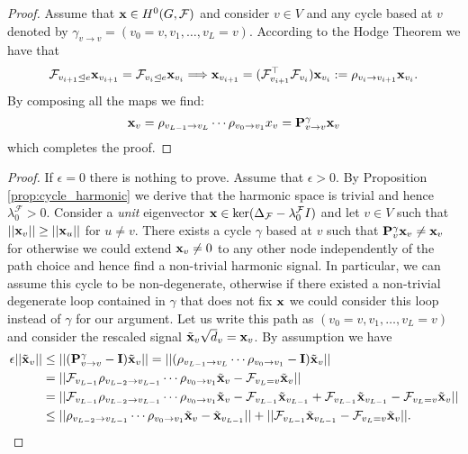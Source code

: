 \documentclass{article}
\def\eps{{\epsilon}}
\def\vx{{\bf{x}}}
\def\mI{{\bf{I}}}
\def\mP{{\bf{P}}}
\newcommand{\tleq}{\trianglelefteq}
\begin{document}
\CycleHarmonic*
\begin{proof}
Assume that $\vx\in H^{0}(G,\mathcal{F})$ and consider $v\in V$ and any cycle based at $v$ denoted by $\gamma_{v\rightarrow v} = (v_{0} = v,v_{1},\ldots, v_{L}=v)$. According to the Hodge Theorem we have that 
\[
\mathcal{F}_{v_{i+1}\tleq e}\vx_{v_{i+1}} = \mathcal{F}_{v_{i}\tleq e}\vx_{v_{i}}  \Longrightarrow \vx_{v_{i+1}} = (\mathcal{F}_{v_{i+1}}^{\top}\mathcal{F}_{v_{i}})\vx_{v_{i}} := \rho_{v_{i}\rightarrow v_{i+1}}\vx_{v_{i}}.
\]
\noindent By composing all the maps we find:
\[
\vx_{v} = \rho_{v_{L-1}\rightarrow v_{L}}\cdots \rho_{v_{0}\rightarrow v_{1}}x_{v} = \mP^{\gamma}_{v\rightarrow v}\vx_{v} 
\]
\noindent which completes the proof.
\end{proof}

\LowerBoundEigen*
\begin{proof}
If $\eps = 0$ there is nothing to prove. Assume that $\eps > 0$. By Proposition \ref{prop:cycle_harmonic} we derive that the harmonic space is trivial and hence $\lambda_{0}^{\mathcal{F}} > 0$. Consider a \emph{unit} eigenvector $\vx \in \mathrm{ker}(\Delta_{\mathcal{F}} - \lambda_{0}^{\mathcal{F}}I)$ and let $v\in V$ such that $\lvert\lvert \vx_{v} \rvert\rvert \geq \lvert\lvert \vx_{u}\rvert\rvert$ for $u\neq v$. There exists a cycle $\gamma$ based at $v$ such that $\mP^{\gamma}_{v}\vx_{v} \neq \vx_{v}$ for otherwise we could extend $\vx_{v} \neq 0$ to any other node independently of the path choice and hence find a non-trivial harmonic signal. In particular, we can assume this cycle to be non-degenerate, otherwise if there existed a non-trivial degenerate loop contained in $\gamma$ that does not fix $\vx$ we could consider this loop instead of $\gamma$ for our argument. Let us write this path as $(v_{0} = v,v_{1},\ldots,v_{L}=v)$ and consider the rescaled signal $\tilde{\vx}_{v}\sqrt{d}_{v} = \vx_{v}$. By assumption we have 
\begin{align*}
\eps \lvert\lvert \tilde{\vx}_{v}\rvert\rvert &\leq \lvert\lvert (\mP^{\gamma}_{v\rightarrow v} - \mI)\tilde{\vx}_{v}\rvert\rvert = \lvert\lvert (\rho_{v_{L-1}\rightarrow v_{L}}\cdots \rho_{v_{0}\rightarrow v_{1}} - \mI)\tilde{\vx}_{v}\rvert\rvert \\ &= \lvert\lvert \mathcal{F}_{v_{L-1}}\rho_{v_{L-2}\rightarrow v_{L-1}}\cdots \rho_{v_{0}\rightarrow v_{1}}\tilde{\vx}_{v} - \mathcal{F}_{v_{L}=v}\tilde{\vx}_{v}\rvert\rvert \\
&= \lvert\lvert \mathcal{F}_{v_{L-1}}\rho_{v_{L-2}\rightarrow v_{L-1}}\cdots \rho_{v_{0}\rightarrow v_{1}}\tilde{\vx}_{v} - \mathcal{F}_{v_{L-1}}\tilde{\vx}_{v_{L-1}} + \mathcal{F}_{v_{L-1}}\tilde{\vx}_{v_{L-1}} - \mathcal{F}_{v_{L}=v}\tilde{\vx}_{v}\rvert\rvert \\ &\leq \lvert\lvert \rho_{v_{L-2}\rightarrow v_{L-1}}\cdots \rho_{v_{0}\rightarrow v_{1}}\tilde{\vx}_{v} - \tilde{\vx}_{v_{L-1}}\rvert\rvert + \lvert\lvert \mathcal{F}_{v_{L-1}}\tilde{\vx}_{v_{L-1}} - \mathcal{F}_{v_{L}=v}\tilde{\vx}_{v}\rvert\rvert.

\end{align*}
\end{proof}
\end{document}
